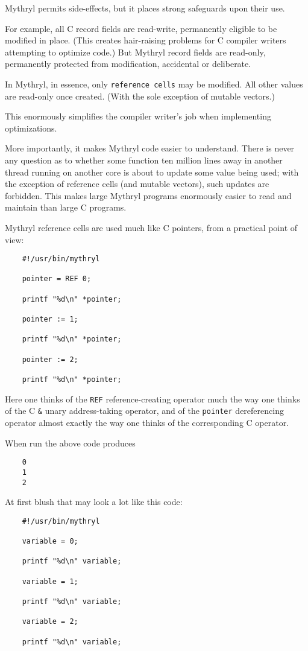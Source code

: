 Mythryl permits side-effects, but it places strong safeguards 
upon their use.

For example, all C record fields are read-write, permanently 
eligible to be modified in place.  (This creates hair-raising 
problems for C compiler writers attempting to optimize code.) 
But Mythryl record fields are read-only, permanently 
protected from modification, accidental or deliberate.

In Mythryl, in essence, only {\tt reference cells} may be 
modified.  All other values are read-only once created. 
(With the sole exception of mutable vectors.)

This enormously simplifies the compiler writer's job when 
implementing optimizations.

More importantly, it makes Mythryl code easier to understand.  There 
is never any question as to whether some function ten million lines 
away in another thread running on another core is about to update some 
value being used; with the exception of reference cells (and mutable 
vectors), such updates are forbidden.  This makes large Mythryl 
programs enormously easier to read and maintain than large C programs.

Mythryl reference cells are used much like C pointers, from 
a practical point of view:

\begin{verbatim}
    #!/usr/bin/mythryl

    pointer = REF 0;

    printf "%d\n" *pointer;

    pointer := 1;

    printf "%d\n" *pointer;

    pointer := 2;

    printf "%d\n" *pointer;
\end{verbatim}

Here one thinks of the {\tt REF} reference-creating operator much the way one 
thinks of the C {\tt \&} unary address-taking operator, 
and of the {\tt *pointer} dereferencing operator almost exactly the 
way one thinks of the corresponding C operator.

When run the above code produces

\begin{verbatim}
    0
    1
    2
\end{verbatim}

At first blush that may look a lot like this code:

\begin{verbatim}
    #!/usr/bin/mythryl

    variable = 0;

    printf "%d\n" variable;

    variable = 1;

    printf "%d\n" variable;

    variable = 2;

    printf "%d\n" variable;
\end{verbatim}

